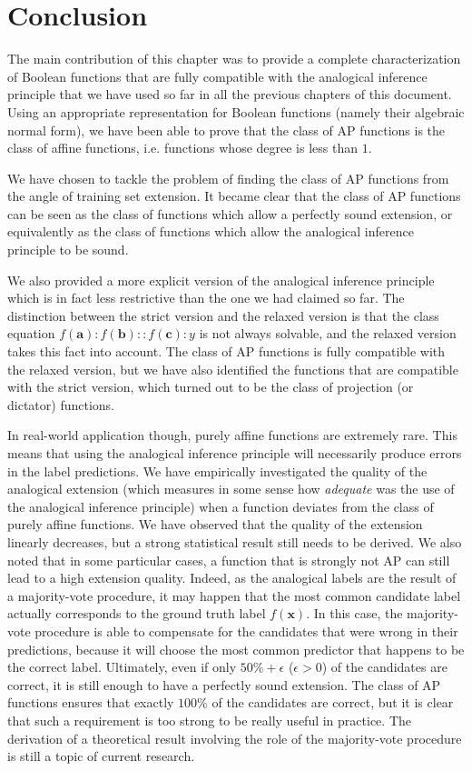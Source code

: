 \section*{Conclusion}

The main contribution of this chapter was to provide a complete
characterization of Boolean functions that are fully compatible with the
analogical inference principle that we have used so far in all the previous
chapters of this document. Using an appropriate representation for Boolean
functions (namely their algebraic normal form), we have been able to prove that
the class of AP functions is the class of affine functions, i.e. functions
whose degree is less than $1$.

We have chosen to tackle the problem of finding the class of AP functions from the
angle of training set extension. It became clear that the class of AP functions
can be seen as the class of functions which allow  a perfectly sound extension,
or equivalently as the class of functions which allow the analogical inference
principle to be sound.

We also provided a more explicit version of the analogical inference principle
which is in fact less restrictive than the one we had claimed so far. The
distinction between the strict version and the relaxed version is that the
class equation $f(\mathbf{a}) : f(\mathbf{b}) ::f(\mathbf{c}) :y$ is not always
solvable, and the relaxed version takes this fact into account. The class of AP
functions is fully compatible with the relaxed version, but we have also
identified the functions that are compatible with the strict version, which
turned out to be the class of projection (or dictator) functions.

In real-world application though, purely affine functions are extremely rare.
This means that using the analogical inference principle will necessarily
produce errors in the label predictions. We have empirically investigated the
quality of the analogical extension (which measures in some sense how
\textit{adequate} was the use of the analogical inference principle) when a
function deviates from the class of purely affine functions. We have observed
that the quality of the extension linearly decreases, but a strong statistical
result still needs to be derived. We also noted that in some particular cases,
a function that is strongly not AP can still lead to a high extension quality.
Indeed, as the analogical labels are the result of a majority-vote procedure,
it may happen that the most common candidate label actually corresponds to the
ground truth label $f(\mathbf{x})$. In this case, the majority-vote procedure
is able to compensate for the candidates that were wrong in their predictions,
because it will choose the most common predictor that happens to be the
correct label.  Ultimately, even if only $50\% + \epsilon$ ($\epsilon > 0$) of
the candidates are correct, it is still enough to have a perfectly sound
extension. The class of AP functions ensures that exactly $100\%$ of the
candidates are correct, but it is clear that such a requirement is too strong
to be really useful in practice. The derivation of a theoretical result
involving the role  of the majority-vote procedure is still a topic of current
research.

